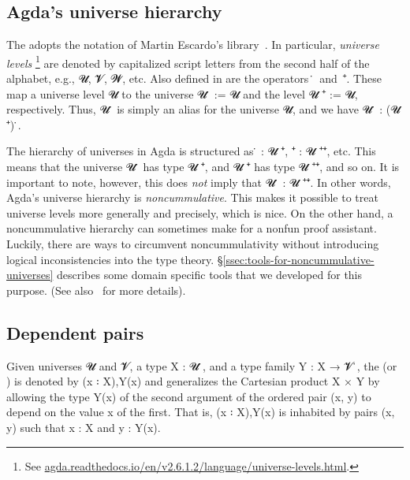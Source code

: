 \subsection{Agda's universe hierarchy}\label{ssec:agdas-universe-hierarchy}
The \agdaualib adopts the notation of Martin Escardo's \typetopology library~\cite{MHE}. In particular, \emph{universe levels}%
\footnote{See \href{https://agda.readthedocs.io/en/v2.6.1.2/language/universe-levels.html}{agda.readthedocs.io/en/v2.6.1.2/language/universe-levels.html}.}
are denoted by capitalized script letters from the second half of the alphabet, e.g., \ab 𝓤, \ab 𝓥, \ab 𝓦, etc.  Also defined in \typetopology are the operators~\af ̇~and~\af ⁺. These map a universe level \ab 𝓤 to the universe \ab 𝓤 \af ̇ := \Set \ab 𝓤 and the level \ab 𝓤 \af ⁺ \aod := \lsuc \ab 𝓤, respectively.  Thus, \ab 𝓤 \af ̇ is simply an alias for the universe \Set \ab 𝓤, and we have \ab 𝓤 \af ̇ \as : (\ab 𝓤 \af ⁺) \af ̇.

The hierarchy of universes in Agda is structured as  \af ̇ \as : \ab 𝓤 \af ⁺\af ̇, \hskip3mm
 \af ⁺\af ̇ \as : \ab 𝓤 \af ⁺\af ⁺\af ̇, etc. This means that the universe \ab 𝓤 \af ̇ has type \ab 𝓤  \af ⁺\af ̇, and 𝓤 \af ⁺\af ̇ has type \ab 𝓤 \af ⁺\af ⁺\af ̇, and so on.  It is important to note, however, this does \emph{not} imply that \ab 𝓤 \af ̇ \as : \ab 𝓤 \af ⁺\af ⁺\af ̇. In other words, Agda's universe hierarchy is \emph{noncummulative}. This makes it possible to treat universe levels more generally and precisely, which is nice. On the other hand, a noncummulative hierarchy can sometimes make for a nonfun proof assistant. Luckily, there are ways to circumvent noncummulativity without introducing logical inconsistencies into the type theory. \S\ref{ssec:tools-for-noncummulative-universes} describes some domain specific tools that we developed for this purpose. (See also~\cite[\S3.3]{DeMeo:2021} for more details).




\subsection{Dependent pairs}\label{ssec:dependent-pairs}
Given universes \ab 𝓤 and \ab 𝓥, a type \ab X \as : \ab 𝓤 \aof ̇, and a type family \ab Y \as : X \as → \ab 𝓥 \aof ̇, the  (or ) is denoted by (\ab x \as ꞉ \ab X)\as ,\ab Y(\ab x) and generalizes the Cartesian product \ab X \as × \ab Y by allowing the type \ab Y(\ab x) of the second argument of the ordered pair (\ab x\as , \ab y) to depend on the value \ab x of the first.  That is, (\ab x \as ꞉ \ab X)\as ,\ab Y(\ab x) is inhabited by pairs (\ab x\as , \ab y) such that \ab x \as : \ab X and \ab y \as : \ab Y(\ab x).

